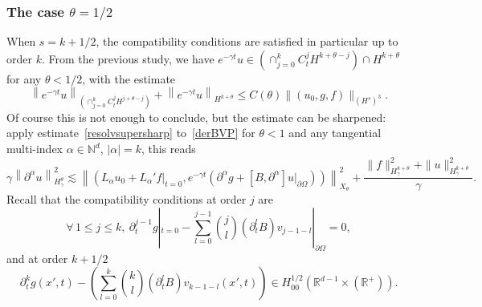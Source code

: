 \documentclass[AHL,Unicode,longabstracts,published]{cedram}
\newcommand{\R}{\mathbb{R}}
\newcommand{\N}{\mathbb{N}}
\newcommand{\clA}{\mathcal{A}}
\let\oldforall\forall
\renewcommand*{\forall}{\mathrel{\oldforall}}
\newcommand{\N}{\mathbb{N}}
\begin{document}
\subsubsection{The case $\theta=1/2$}\label{cas1/2}
When $s=k+1/2$, the compatibility conditions are satisfied in particular up to order $k$. From the previous study, we have $e^{-\gamma t}u\in (\cap_{j=0}^k C_t^jH^{k+\theta-j})\cap H^{k+\theta}$ for any $\theta<1/2$, with the estimate
\[
\left\|e^{-\gamma t}u\right\|_{\left(\cap_{j=0}^k C_t^jH^{j+\theta-j}\right)} +\left\|e^{-\gamma t}u\right\|_{H^{k+\theta}}
\leq C(\theta)\|(u_0,g,f)\|_{(H^s)^3}.
\]
Of course this is not enough to conclude, but the estimate can be sharpened: apply estimate~\eqref{resolvsupersharp} to~\eqref{derBVP} for $\theta<1$ and any tangential multi-index $\alpha\in \N^d$, $|\alpha|=k$, this reads
\[
\gamma\left\|\partial^\alpha u\right\|_{H^\theta_\gamma}^2 \lesssim \left\|\left(L_\alpha u_{0}+L_\alpha'f|_{t=0},e^{-\gamma t}\left(\partial^\alpha g+\left[B,\partial^\alpha\right]u|_{\partial\Omega}\right)\right)\right\|_{X_\theta}^2 +\frac{\|f\|_{H^{k+\theta}_\gamma}^2+
\|u\|^2_{H^{k+\theta}_\gamma}}{\gamma}.
\]
Recall that the compatibility conditions at order $j$ are
\[
\forall\,1\leq j\leq k,\
\partial_t^{j-1}g|_{t=0}-\sum_{l=0}^{j-1}
\binom{j}{l}\left(\partial_t^lB\right)v_{j-1-l}|_{\partial\Omega}=0,
\]
and at order $k+1/2$
\begin{equation*}
\partial_t^{k}g(x',t)-\left(\sum_{l=0}^{k}
\binom{k}{l}\left(\partial_t^lB\right)v_{k-1-l}(x',t)\right)
\in H^{1/2}_{00}\left(\R^{d-1}\times (\R^+)\right).
\end{equation*}

\end{document}
